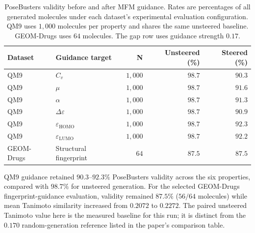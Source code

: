 
\begin{table}[t]
    \centering
    \small
    \caption{PoseBusters validity before and after MFM guidance.
    Rates are percentages of all generated molecules under each dataset's
    experimental evaluation configuration. QM9 uses $1{,}000$ molecules per
    property and shares the same unsteered baseline. GEOM-Drugs uses $64$
    molecules. The gap row uses guidance strength $0.17$.}
    \label{tab:tabasco-pb-guidance}
    \begin{tabular}{llrrr}
        \toprule
        \textbf{Dataset} & \textbf{Guidance target} & \textbf{N}
        & \textbf{Unsteered (\%)} & \textbf{Steered (\%)} \\
        \midrule
        QM9 & $C_v$ & $1{,}000$ & $98.7$ & $90.3$ \\
        QM9 & $\mu$ & $1{,}000$ & $98.7$ & $91.6$ \\
        QM9 & $\alpha$ & $1{,}000$ & $98.7$ & $91.3$ \\
        QM9 & $\Delta\varepsilon$ & $1{,}000$ & $98.7$ & $90.9$ \\
        QM9 & $\varepsilon_{\mathrm{HOMO}}$ & $1{,}000$ & $98.7$ & $92.3$ \\
        QM9 & $\varepsilon_{\mathrm{LUMO}}$ & $1{,}000$ & $98.7$ & $92.2$ \\
        \midrule
        GEOM-Drugs & Structural fingerprint & $64$ & $87.5$ & $87.5$ \\
        \bottomrule
    \end{tabular}
\end{table}

QM9 guidance retained $90.3$--$92.3\%$ PoseBusters validity across the six
properties, compared with $98.7\%$ for unsteered generation. For the selected
GEOM-Drugs fingerprint-guidance evaluation, validity remained $87.5\%$
($56/64$ molecules) while mean Tanimoto similarity increased from $0.2072$
to $0.2272$. The paired unsteered Tanimoto value here is the measured baseline
for this run; it is distinct from the $0.170$ random-generation reference
listed in the paper's comparison table.
